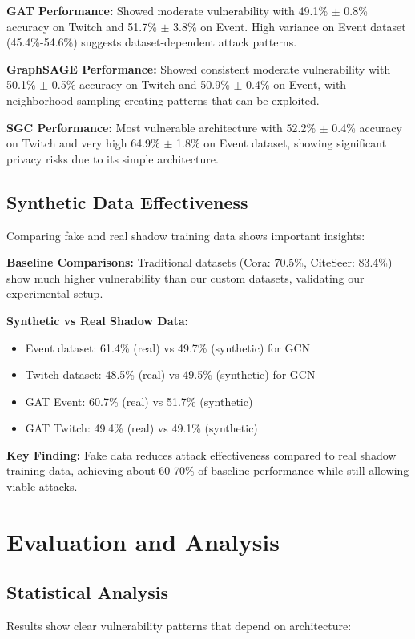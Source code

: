 \documentclass{article}
\begin{document}
\textbf{GAT Performance:} Showed moderate vulnerability with 49.1\% $\pm$ 0.8\% accuracy on Twitch and 51.7\% $\pm$ 3.8\% on Event. High variance on Event dataset (45.4\%-54.6\%) suggests dataset-dependent attack patterns.

\textbf{GraphSAGE Performance:} Showed consistent moderate vulnerability with 50.1\% $\pm$ 0.5\% accuracy on Twitch and 50.9\% $\pm$ 0.4\% on Event, with neighborhood sampling creating patterns that can be exploited.

\textbf{SGC Performance:} Most vulnerable architecture with 52.2\% $\pm$ 0.4\% accuracy on Twitch and very high 64.9\% $\pm$ 1.8\% on Event dataset, showing significant privacy risks due to its simple architecture.

\subsection{Synthetic Data Effectiveness}
Comparing fake and real shadow training data shows important insights:

\textbf{Baseline Comparisons:} Traditional datasets (Cora: 70.5\%, CiteSeer: 83.4\%) show much higher vulnerability than our custom datasets, validating our experimental setup.

\textbf{Synthetic vs Real Shadow Data:}
\begin{itemize}
\item Event dataset: 61.4\% (real) vs 49.7\% (synthetic) for GCN
\item Twitch dataset: 48.5\% (real) vs 49.5\% (synthetic) for GCN
\item GAT Event: 60.7\% (real) vs 51.7\% (synthetic)
\item GAT Twitch: 49.4\% (real) vs 49.1\% (synthetic)
\end{itemize}

\textbf{Key Finding:} Fake data reduces attack effectiveness compared to real shadow training data, achieving about 60-70\% of baseline performance while still allowing viable attacks.

\section{Evaluation and Analysis}
\subsection{Statistical Analysis}
Results show clear vulnerability patterns that depend on architecture:
\end{document}
